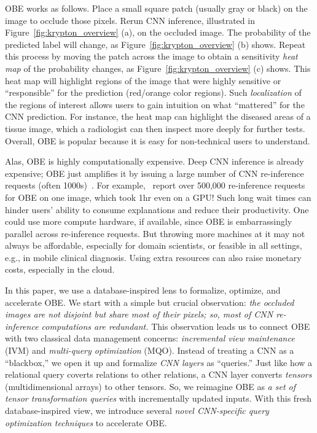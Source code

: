 OBE works as follows. Place a small square patch (usually gray or black) on the image to occlude those pixels. Rerun CNN inference, illustrated in Figure~\ref{fig:krypton_overview} (a), on the occluded image. The probability of the predicted label will change, as Figure~\ref{fig:krypton_overview} (b) shows. Repeat this process by moving the patch across the image to obtain a sensitivity \textit{heat map} of the probability changes, as Figure~\ref{fig:krypton_overview} (c) shows. This heat map will highlight regions of the image that were highly sensitive or ``responsible'' for the prediction (red/orange color regions). Such \textit{localization} of the regions of interest allows users to gain intuition on what ``mattered'' for the CNN prediction. For instance, the heat map can highlight the diseased areas of a tissue image, which a radiologist can then inspect more deeply for further tests. Overall, OBE is popular because it is easy for non-technical users to understand.

Alas, OBE is highly computationally expensive. Deep CNN inference is already expensive; OBE just amplifies it by issuing a large number of CNN re-inference requests (often 1000s)~\cite{ketkar2017introduction}. For example,~\cite{zintgraf2017visualizing} report over 500,000 re-inference requests for OBE on one image, which took 1hr even on a GPU! Such long wait times can hinder users' ability to consume explanations and reduce their productivity. One could use more compute hardware, if available, since OBE is embarrassingly parallel across re-inference requests. But throwing more machines at it may not always be affordable, especially for domain scientists, or feasible in all settings, e.g., in mobile clinical diagnosis. Using extra resources can also raise monetary costs, especially in the cloud.

In this paper, we use a database-inspired lens to formalize, optimize, and accelerate OBE. We start with a simple but crucial observation: \textit{the occluded images are not disjoint but share most of their pixels; so, most of CNN re-inference computations are redundant.} This observation leads us to connect OBE with two classical data management concerns: \textit{incremental view maintenance} (IVM) and \textit{multi-query optimization} (MQO). Instead of treating a CNN as a ``blackbox,'' we open it up and formalize \textit{CNN layers} as ``queries.'' Just like how a relational query coverts relations to other relations, a CNN layer converts \textit{tensors} (multidimensional arrays) to other tensors. So, we reimagine OBE as \textit{a set of tensor transformation queries} with incrementally updated inputs. With this fresh database-inspired view, we introduce several \textit{novel CNN-specific query optimization techniques} to accelerate OBE.

